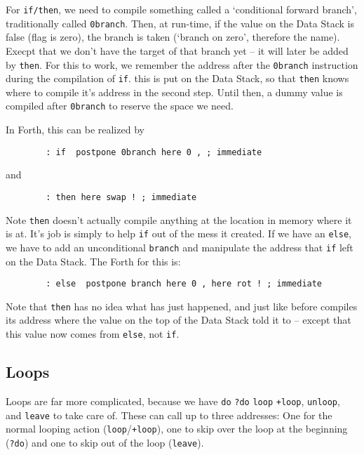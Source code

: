 For \texttt{if/then}, we need to compile something called a `conditional forward
branch', traditionally called \texttt{0branch}. Then, at run-time, if the value
on the Data Stack is false (flag is zero), the branch is taken (`branch on
zero', therefore the name). Execpt that we don't have the target of that branch
yet -- it will later be added by \texttt{then}. For this to work, we remember
the address after the \texttt{0branch} instruction during the compilation of
\texttt{if}. this is put on the Data Stack, so that \texttt{then} knows where to
compile it's address in the second step.  Until then, a dummy value is compiled
after \texttt{0branch} to reserve the space we need. 

In Forth, this can be realized by

\begin{lstlisting}
        : if  postpone 0branch here 0 , ; immediate
\end{lstlisting}

and 

\begin{lstlisting}
        : then here swap ! ; immediate
\end{lstlisting}

Note \texttt{then} doesn't actually compile anything at the location in memory
where it is at. It's job is simply to help \texttt{if} out of the mess it
created.  If we have an \texttt{else}, we have to add an unconditional
\texttt{branch} and manipulate the address that \texttt{if} left on the Data
Stack. The Forth for this is: 

\begin{lstlisting}
        : else  postpone branch here 0 , here rot ! ; immediate
\end{lstlisting}

Note that \texttt{then} has no idea what has just happened, and just like before
compiles its address where the value on the top of the Data Stack told it to --
except that this value now comes from \texttt{else}, not \texttt{if}. 


\subsection{Loops} 

Loops are far more complicated, because we have \texttt{do} \texttt{?do}
\texttt{loop} \texttt{+loop}, \texttt{unloop}, and \texttt{leave} to take care
of. These can call up to three addresses: One for the normal looping action
(\texttt{loop}/\texttt{+loop}), one to skip over the loop at the beginning
(\texttt{?do}) and one to skip out of the loop (\texttt{leave}). 

